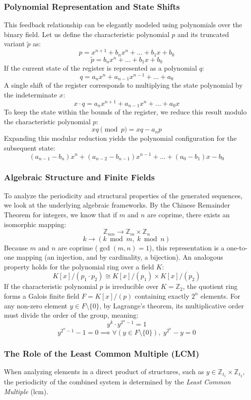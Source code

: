\subsubsection{Polynomial Representation and State Shifts}
This feedback relationship can be elegantly modeled using polynomials over the binary field. Let us define the characteristic polynomial $p$ and its truncated variant $\tilde{p}$ as:
\[
p = x^{n+1} + b_n x^n + \dots + b_1 x + b_0
\]
\[
\tilde{p} = b_n x^n + \dots + b_1 x + b_0
\]
If the current state of the register is represented as a polynomial $q$:
\[
q = a_n x^n + a_{n-1}x^{n-1} + \dots + a_0
\]
A single shift of the register corresponds to multiplying the state polynomial by the indeterminate $x$:
\[
x \cdot q = a_n x^{n+1} + a_{n-1}x^{n} + \dots + a_0x
\]
To keep the state within the bounds of the register, we reduce this result modulo the characteristic polynomial $p$:
\[
xq \pmod p = xq - a_np
\]
Expanding this modular reduction yields the polynomial configuration for the subsequent state:
\[
(a_{n-1} - b_n)x^{n} + (a_{n-2} - b_{n-1})x^{n-1} + \dots + (a_0 - b_1)x - b_0
\]

\subsubsection{Algebraic Structure and Finite Fields}
To analyze the periodicity and structural properties of the generated sequences, we look at the underlying algebraic frameworks. By the Chinese Remainder Theorem for integers, we know that if $m$ and $n$ are coprime, there exists an isomorphic mapping:
\[
\mathbb{Z}_{mn} \rightarrow \mathbb{Z}_m \times \mathbb{Z}_n
\]
\[
k \rightarrow (k \bmod{m},\; k \bmod{n})
\]
Because $m$ and $n$ are coprime ($\gcd(m,n)=1$), this representation is a one-to-one mapping (an injection, and by cardinality, a bijection). An analogous property holds for the polynomial ring over a field $K$:
\[
K[x]/(p_1 \cdot p_2) \cong K[x]/(p_1) \times K[x]/(p_2)
\]
If the characteristic polynomial $p$ is irreducible over $K = \mathbb{Z}_2$, the quotient ring forms a Galois finite field $F = K[x]/(p)$ containing exactly $2^n$ elements. For any non-zero element $y \in F \setminus \{0\}$, by Lagrange's theorem, its multiplicative order must divide the order of the group, meaning:
\[
y^k \cdot y^{2^n-1} = 1
\]
\[
y^{2^n-1} - 1 = 0 \implies \forall (y \in F \setminus \{0\}), \; y^{2^n} - y = 0
\]

\subsubsection{The Role of the Least Common Multiple (LCM)}
When analyzing elements in a direct product of structures, such as $y \in \mathbb{Z}_{t_1} \times \mathbb{Z}_{t_2}$, the periodicity of the combined system is determined by the \textit{Least Common Multiple} ($\text{lcm}$). 

